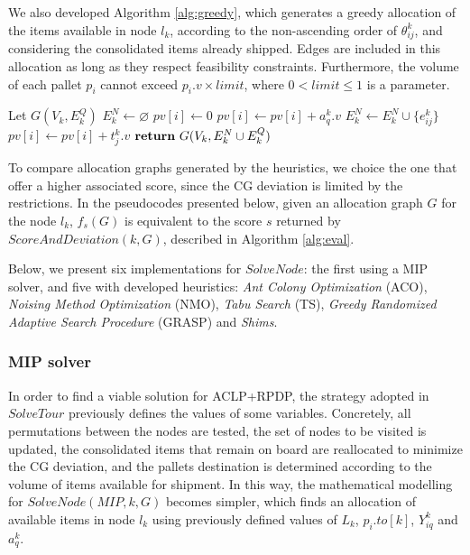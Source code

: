 \documentclass[preprint,authoryear]{elsarticle}
\begin{document}
We also developed Algorithm \ref{alg:greedy}, which generates a greedy allocation of the items available in node $l_k$, according to the non-ascending order of $\theta^k_{ij}$, and considering the consolidated items already shipped. Edges are included in this allocation as long as they respect feasibility constraints. Furthermore, the volume of each pallet $p_i$\/ cannot exceed $p_i.v \times limit$, where $ 0 < limit \leq 1$\/ is a parameter.

\begin{algorithm}[H]
	\caption{ $Greedy(k, G, limit)$}  \label{alg:greedy}

	\begin{algorithmic}[1]
		\State Let $G(V_k, E^Q_k)$
		\State $E^N_k \gets \varnothing$ 			
			\State $pv[i] \gets 0$ 		
		\EndFor
				\State $pv[i] \gets pv[i] + a_q^k.v$ 
			\EndIf		
		\EndFor		
				\State $E^N_k \gets E^N_k \cup \{e_{ij}^k\}$ 
				\State $pv[i] \gets pv[i] + t_j^k.v$ 	
			\EndIf
		\EndFor
		\State ${\bf return}\ G(V_k, E^N_k \cup E^Q_k)$
		
	\end{algorithmic}
\end{algorithm}

To compare allocation graphs generated by the heuristics, we choice the one that offer a higher associated score, since the CG deviation is limited by the restrictions. In the pseudocodes presented below, given an allocation graph $G$\/ for the node $l_k$, $f_s(G)$\/ is equivalent to the score $s$\/ returned by $ScoreAndDeviation(k,G) $, described in Algorithm \ref{alg:eval}.

Below, we present six implementations for $SolveNode$: the first using a MIP solver, and five with developed heuristics: {\it Ant Colony Optimization}\/ (ACO), {\it Noising Method Optimization}\/ (NMO), {\it Tabu Search}\/ (TS), {\it Greedy Randomized Adaptive Search Procedure}\/ (GRASP) and {\it Shims}.



\subsubsection{MIP solver}
\label{solver}

In order to find a viable solution for ACLP+RPDP, the strategy adopted in $SolveTour$\/ previously defines the values of some variables. Concretely, all permutations between the nodes are tested, the set of nodes to be visited is updated, the consolidated items that remain on board are reallocated to minimize the CG deviation, and the pallets destination is determined according to the volume of items available for shipment. In this way, the mathematical modelling for $SolveNode(MIP,k,G)$\/ becomes simpler, which finds an allocation of available items in node $l_k$\/ using previously defined values of $L_k$, $p_i.to[k]$, $Y^k_{iq}$\/ and $a^k_q$. 
\end{document}
